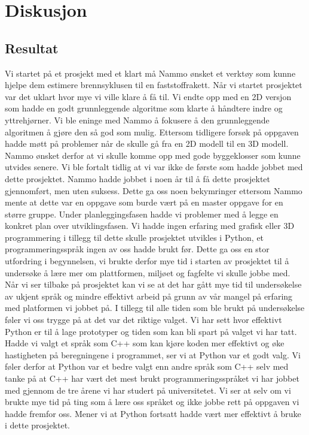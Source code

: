 \chapter{Diskusjon}
\label{chap:discussion}

\section{Resultat}
Vi startet på et prosjekt med et klart må Nammo ønsket et verktøy som kunne hjelpe dem estimere brennsyklusen til en faststoffrakett.  Når vi startet prosjektet var det uklart hvor mye vi ville klare å få til. Vi endte opp med en 2D versjon som hadde en godt grunnleggende algoritme som klarte å håndtere indre og yttrehjørner. Vi ble eninge med Nammo å fokusere å den grunnleggende algoritmen å gjøre den så god som mulig. Ettersom tidligere forsøk på oppgaven hadde møtt på problemer når de skulle gå fra en 2D modell til en 3D modell. Nammo ønsket derfor at vi skulle komme opp med gode byggeklosser som kunne utvides senere. Vi ble fortalt tidlig at vi var ikke de første som hadde jobbet med dette prosjektet. Nammo hadde jobbet i noen år til å få dette prosjektet gjennomført, men uten suksess. Dette ga oss noen bekymringer ettersom Nammo mente at dette var en oppgave som burde vært på en master oppgave for en større gruppe. Under planleggingsfasen hadde vi problemer med å legge en konkret plan over utviklingsfasen. Vi hadde ingen erfaring med grafisk  eller 3D programmering i tillegg til dette skulle prosjektet utvikles i Python, et programmeringsspråk ingen av oss hadde brukt før. Dette ga oss en stor utfordring i begynnelsen, vi brukte derfor mye tid i starten av prosjektet til å undersøke å lære mer om plattformen, miljøet og fagfelte vi skulle jobbe med. Når vi ser tilbake på prosjektet kan vi se at det har gått mye tid til undersøkelse av ukjent språk og mindre effektivt arbeid på grunn av vår mangel på erfaring med platformen vi jobbet på. I tillegg til alle tiden som ble brukt på undersøkelse føler vi oss trygge på at det var det riktige valget. Vi har sett hvor effektivt Python er til å lage prototyper og tiden som kan bli spart på valget vi har tatt. Hadde vi valgt et språk som C++ som kan kjøre koden mer effektivt og øke hastigheten på beregningene i programmet, ser vi at Python var et godt valg. Vi føler derfor at Python var et bedre valgt enn andre språk som C++ selv med tanke på at C++ har vært det mest brukt programmeringsspråket vi har jobbet med gjennom de tre årene vi har studert på universitetet. Vi ser at selv om vi brukte mye tid på ting som å lære oss språket og ikke jobbe rett på oppgaven vi hadde fremfor oss. Mener vi at Python fortsatt hadde vært mer effektivt å bruke i dette prosjektet.

